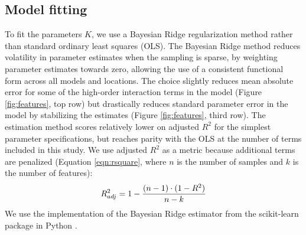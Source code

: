 \documentclass[gmd, manuscript]{copernicus} %
\begin{document}

\subsection{Model fitting}
To fit the parameters $K$, we use a Bayesian Ridge regularization method \citep{MacKay91} rather than standard ordinary least squares (OLS). 
The Bayesian Ridge method reduces volatility in parameter estimates when the sampling is sparse, by weighting parameter estimates towards zero, allowing the use of a consistent functional form across all models and locations. 
The choice slightly reduces mean absolute error for some of the high-order interaction terms in the model (Figure \ref{fig:features}, top row) but drastically reduces standard parameter error in the model by stabilizing the estimates (Figure \ref{fig:features}, third row).
The estimation method scores relatively lower on adjusted $R^2$ for the simplest parameter specifications, but reaches parity with the OLS at the number of terms included in this study. We use adjusted $R^2$ as a metric because additional terms are penalized (Equation \ref{eqn:rsquare}, where $n$ is the number of samples and $k$ is the number of features): 
\begin{equation}
	\centering
    \label{eqn:rsquare}
    R^{2}_{adj} = 1 - \frac{(n-1) \cdot (1 - R^{2})}{n - k}
\end{equation}
We use the implementation of the Bayesian Ridge estimator from the scikit-learn package in Python \citep{scikit-learn}. 
\end{document}
